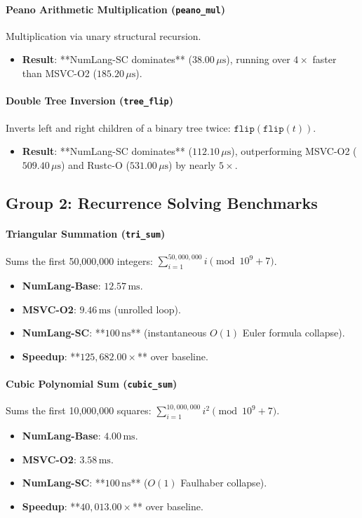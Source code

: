 \paragraph{Peano Arithmetic Multiplication (\texttt{peano\_mul})}
Multiplication via unary structural recursion.
\begin{itemize}
    \item \textbf{Result}: **NumLang-SC dominates** ($38.00\,\mu\text{s}$), running over $4\times$ faster than MSVC-O2 ($185.20\,\mu\text{s}$).
\end{itemize}

\paragraph{Double Tree Inversion (\texttt{tree\_flip})}
Inverts left and right children of a binary tree twice: $\mathtt{flip}(\mathtt{flip}(t))$.
\begin{itemize}
    \item \textbf{Result}: **NumLang-SC dominates** ($112.10\,\mu\text{s}$), outperforming MSVC-O2 ($509.40\,\mu\text{s}$) and Rustc-O ($531.00\,\mu\text{s}$) by nearly $5\times$.
\end{itemize}

\subsection{Group 2: Recurrence Solving Benchmarks}

\paragraph{Triangular Summation (\texttt{tri\_sum})}
Sums the first 50,000,000 integers: $\sum_{i=1}^{50,000,000} i \pmod{10^9+7}$.
\begin{itemize}
    \item \textbf{NumLang-Base}: $12.57\,\text{ms}$.
    \item \textbf{MSVC-O2}: $9.46\,\text{ms}$ (unrolled loop).
    \item \textbf{NumLang-SC}: **$100\,\text{ns}$** (instantaneous $O(1)$ Euler formula collapse).
    \item \textbf{Speedup}: **$125,682.00\times$** over baseline.
\end{itemize}

\paragraph{Cubic Polynomial Sum (\texttt{cubic\_sum})}
Sums the first 10,000,000 squares: $\sum_{i=1}^{10,000,000} i^2 \pmod{10^9+7}$.
\begin{itemize}
    \item \textbf{NumLang-Base}: $4.00\,\text{ms}$.
    \item \textbf{MSVC-O2}: $3.58\,\text{ms}$.
    \item \textbf{NumLang-SC}: **$100\,\text{ns}$** ($O(1)$ Faulhaber collapse).
    \item \textbf{Speedup}: **$40,013.00\times$** over baseline.
\end{itemize}

